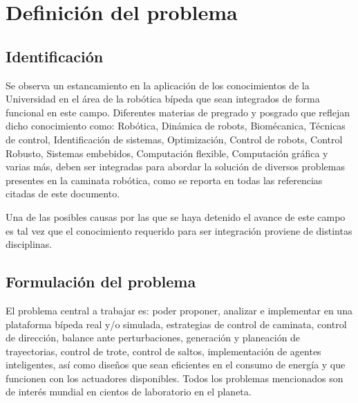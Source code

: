 \documentclass[12pt,twoside,onecolumn,letterpaper]{article}
\begin{document}
\section{Definici\'on del problema}
\label{sec:problema}
\subsection{Identificaci\'on}
Se observa un estancamiento en la aplicaci\'on de los conocimientos de la Universidad en el \'area de la rob\'otica b\'ipeda que sean integrados de forma funcional en este campo. Diferentes materias de pregrado y posgrado que reflejan dicho conocimiento como: Rob\'otica, Din\'amica de robots, Biom\'ecanica, T\'ecnicas de control, Identificaci\'on de sistemas, Optimizaci\'on, Control de robots, Control Robusto, Sistemas embebidos, Computaci\'on flexible, Computaci\'on gr\'afica y varias m\'as, deben ser integradas para abordar la soluci\'on de diversos problemas presentes en la caminata rob\'otica, como se reporta en todas las referencias citadas de este documento.\par
Una de las posibles causas por las que se haya detenido el avance de este campo es tal vez que el conocimiento requerido para ser integraci\'on proviene de distintas disciplinas.\par

\subsection{Formulaci\'on del problema}
El problema central a trabajar es: poder proponer, analizar e implementar en una plataforma b\'ipeda real y/o simulada, estrategias de control de caminata, control de direcci\'on, balance ante perturbaciones, generaci\'on y planeaci\'on de trayectorias, control de trote, control de saltos, implementaci\'on de agentes inteligentes, as\'i como dise\~nos que sean eficientes en el consumo de energ\'ia y que funcionen con los actuadores disponibles. Todos los problemas mencionados son de inter\'es mundial en cientos de laboratorio en el planeta.
\end{document}
